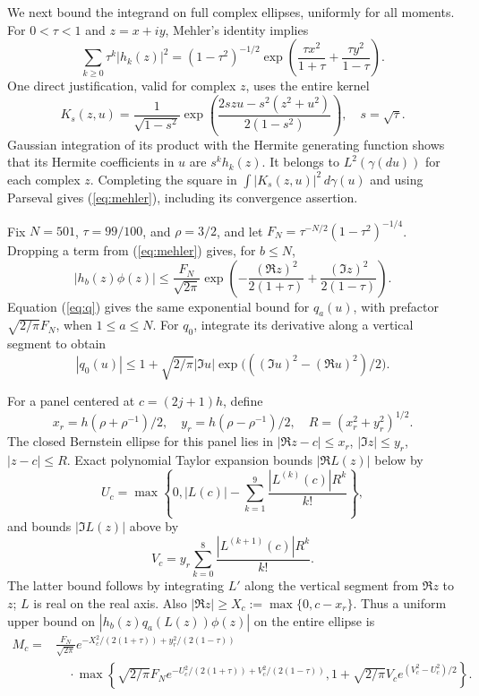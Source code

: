 \documentclass[11pt]{article}
\theoremstyle{definition}\newtheorem{definition}[theorem]{Definition}
\newcommand{\dd}{\,d}
\begin{document}
We next bound the integrand on full complex ellipses, uniformly for all
moments. For $0<\tau<1$ and $z=x+iy$, Mehler's identity implies
\begin{equation}\label{eq:mehler}
 \sum_{k\geq0}\tau^k|h_k(z)|^2
 =(1-\tau^2)^{-1/2}
     \exp\left(\frac{\tau x^2}{1+\tau}
                    +\frac{\tau y^2}{1-\tau}\right).
\end{equation}
One direct justification, valid for complex $z$, uses the entire kernel
\[
 K_s(z,u)=\frac1{\sqrt{1-s^2}}
 \exp\left(\frac{2szu-s^2(z^2+u^2)}{2(1-s^2)}\right),\quad s=\sqrt\tau.
\]
Gaussian integration of its product with the Hermite generating function
shows that its Hermite coefficients in $u$ are $s^kh_k(z)$.
It belongs to $L^2(\gamma(du))$ for each complex $z$. Completing the
square in $\int|K_s(z,u)|^2\dd\gamma(u)$ and using Parseval gives
(\ref{eq:mehler}), including its convergence assertion.

Fix $N=501$, $\tau=99/100$, and $\rho=3/2$, and let
$F_N=\tau^{-N/2}(1-\tau^2)^{-1/4}$. Dropping a term from
(\ref{eq:mehler}) gives, for $b\leq N$,
\begin{equation}\label{eq:hphi-bound}
 |h_b(z)\phi(z)|\leq\frac{F_N}{\sqrt{2\pi}}
 \exp\left(-\frac{(\Re z)^2}{2(1+\tau)}
                  +\frac{(\Im z)^2}{2(1-\tau)}\right).
\end{equation}
Equation (\ref{eq:q}) gives the same exponential bound for $q_a(u)$,
with prefactor $\sqrt{2/\pi}F_N$, when $1\leq a\leq N$.
For $q_0$, integrate its derivative along a vertical segment to obtain
\begin{equation}\label{eq:qzero-bound}
 |q_0(u)|\leq1+\sqrt{2/\pi}|\Im u|
                   \exp\bigl(((\Im u)^2-(\Re u)^2)/2\bigr).
\end{equation}

For a panel centered at $c=(2j+1)h$, define
\[
 x_r=h(\rho+\rho^{-1})/2,\quad y_r=h(\rho-\rho^{-1})/2,
 \quad R=(x_r^2+y_r^2)^{1/2}.
\]
The closed Bernstein ellipse for this panel lies in
$|\Re z-c|\leq x_r$, $|\Im z|\leq y_r$, $|z-c|\leq R$.
Exact polynomial Taylor expansion bounds $|\Re L(z)|$ below by
\[
 U_c=\max\left\{0,|L(c)|-
                       \sum_{k=1}^9\frac{|L^{(k)}(c)|R^k}{k!}\right\},
\]
and bounds $|\Im L(z)|$ above by
\[
 V_c=y_r\sum_{k=0}^8\frac{|L^{(k+1)}(c)|R^k}{k!}.
\]
The latter bound follows by integrating $L'$ along the vertical segment
from $\Re z$ to $z$; $L$ is real on the real axis. Also
$|\Re z|\geq X_c:=\max\{0,c-x_r\}$. Thus a uniform upper bound on
$|h_b(z)q_a(L(z))\phi(z)|$ on the entire ellipse is
\begin{align}\label{eq:Mj}
 M_c={}&\frac{F_N}{\sqrt{2\pi}}
 e^{-X_c^2/(2(1+\tau))+y_r^2/(2(1-\tau))}\nonumber\\
 &\quad\cdot\max\left\{\sqrt{2/\pi}F_N
 e^{-U_c^2/(2(1+\tau))+V_c^2/(2(1-\tau))},
 1+\sqrt{2/\pi}V_c e^{(V_c^2-U_c^2)/2}\right\}.
\end{align}
\end{document}
